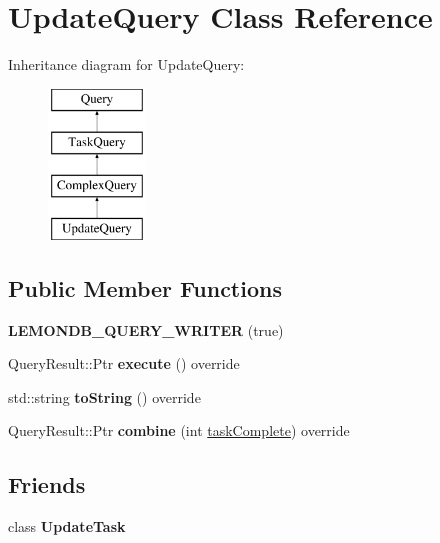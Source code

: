 \hypertarget{class_update_query}{}\section{Update\+Query Class Reference}
\label{class_update_query}
Inheritance diagram for Update\+Query\+:\begin{figure}[H]
\begin{center}
\leavevmode
\includegraphics[height=4.000000cm]{class_update_query}
\end{center}
\end{figure}
\subsection*{Public Member Functions}
\begin{DoxyCompactItemize}
\item 
\mbox{\label{class_update_query_acbfc73db2c9dc38c776e7ca86180a3ab}} 
{\bfseries L\+E\+M\+O\+N\+D\+B\+\_\+\+Q\+U\+E\+R\+Y\+\_\+\+W\+R\+I\+T\+ER} (true)
\item 
\mbox{\label{class_update_query_abad99a8f3fb30f3d276ca890ad3e922d}} 
Query\+Result\+::\+Ptr {\bfseries execute} () override
\item 
\mbox{\label{class_update_query_a74478def6745838d3530f92a11ce54d9}} 
std\+::string {\bfseries to\+String} () override
\item 
\mbox{\label{class_update_query_aad587fda551a09e40d7ee9b1c5287fb0}} 
Query\+Result\+::\+Ptr {\bfseries combine} (int \hyperlink{class_task_query_a3dc3e4c56ddea8ff025239fd9da358d3}{task\+Complete}) override
\end{DoxyCompactItemize}
\subsection*{Friends}
\begin{DoxyCompactItemize}
\item 
\mbox{\label{class_update_query_abd14578c9eab82c35315e1863087c772}} 
class {\bfseries Update\+Task}
\end{DoxyCompactItemize}
